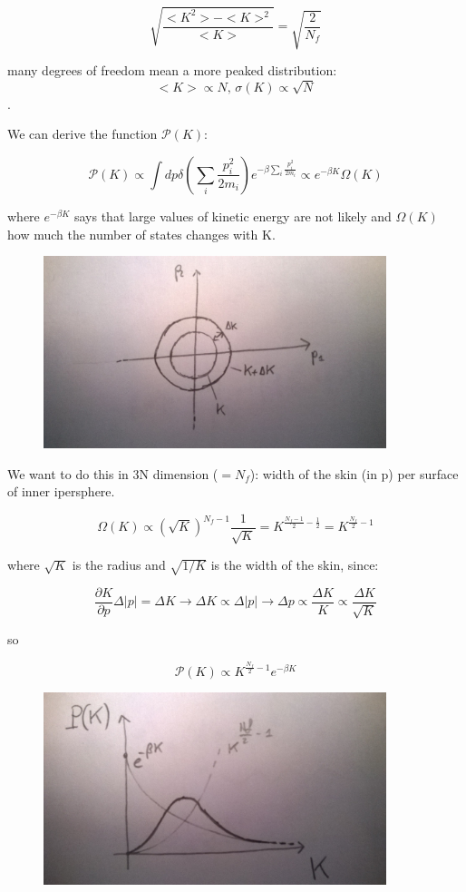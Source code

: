 \documentclass[a4paper, italian, openany]{book}
\begin{document}
$$\sqrt{\frac{<K^2> - <K>^2}{<K>}} = \sqrt{\frac{2}{N_f}}$$

many degrees of freedom mean a more peaked distribution: $$<K> \propto N \mbox{, } \sigma(K) \propto \sqrt{N}$$.

We can derive the function $\mathcal{P}(K)$:

$$\mathcal{P}(K) \propto \int dp \delta(\sum_i \frac{p_i^2}{2 m_i}) e^{-\beta \sum_i \frac{p_i^2}{2m_i}} \propto e^{-\beta K} \Omega(K)$$

where $e^{-\beta K}$ says that large values of kinetic energy are not likely and $\Omega(K)$ how much the number of states changes with K.

\begin{figure}[H]
\centering
\includegraphics[width=100mm]{img/pic11.jpg}
\end{figure}

We want to do this in 3N dimension ($= N_f$): width of the skin (in p) per surface of inner ipersphere.

$$\Omega(K) \propto (\sqrt{K})^{N_f -1} \frac{1}{\sqrt{K}} = K^{\frac{N_f -1}{2} - \frac{1}{2}} = K^{\frac{N_f}{2}-1}$$

where $\sqrt{K}$ is the radius and $\sqrt{1/K}$ is the width of the skin, since:

$$\frac{\partial K}{\partial p} \Delta |p| = \Delta K \rightarrow \Delta K \propto \Delta|p| \rightarrow \Delta p \propto \frac{\Delta K}{K} \propto \frac{\Delta K}{\sqrt{K}}$$

so

$$\mathcal{P}(K) \propto K^{\frac{N_f}{2}-1}e^{-\beta K}$$

\begin{figure}[H]
\centering
\includegraphics[width=100mm]{img/pic12.jpg}
\end{figure}
\end{document}
